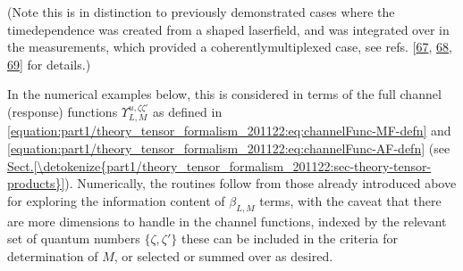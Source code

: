 \documentclass[letterpaper,table,10pt,english]{jupyterBook}
\begin{document}
\sphinxAtStartPar
(Note this is in
distinction to previously demonstrated cases where the time\sphinxhyphen{}dependence
was created from a shaped laser\sphinxhyphen{}field, and was integrated over in the
measurements, which provided a coherently\sphinxhyphen{}multiplexed case, see refs.
{[}\hyperlink{cite.backmatter/bibliography:id600}{67}, \hyperlink{cite.backmatter/bibliography:id602}{68}, \hyperlink{cite.backmatter/bibliography:id601}{69}{]} for details.)

\sphinxAtStartPar
In the numerical examples below, this is considered in terms of the full channel (response) functions \(\varUpsilon_{L,M}^{u,\zeta\zeta'}\) as defined in \eqref{equation:part1/theory_tensor_formalism_201122:eq:channelFunc-MF-defn} and \eqref{equation:part1/theory_tensor_formalism_201122:eq:channelFunc-AF-defn} (see \hyperref[\detokenize{part1/theory_tensor_formalism_201122:sec-theory-tensor-products}]{Sect.\@ \ref{\detokenize{part1/theory_tensor_formalism_201122:sec-theory-tensor-products}}}). Numerically, the routines follow from those already introduced above for exploring the information content of \(\beta_{L,M}\) terms, with the caveat that there are more dimensions to handle in the channel functions, indexed by the relevant set of quantum numbers \(\{\zeta,\zeta'\}\) \sphinxhyphen{} these can be included in the criteria for determination of \(M\), or selected or summed over as desired.
\end{document}
